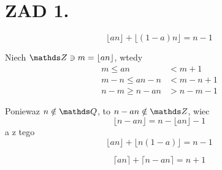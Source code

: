 \documentclass{article}[13pt]
\begin{document}
    \section*{ZAD 1.}
    $$\lfloor an\rfloor+\lfloor(1-a)n\rfloor=n-1$$

    Niech $\Z\ni m=\lfloor an\rfloor$, wtedy
    \begin{align*}
        m\leq an &<m+1\\
        m-n\leq an-n&<m-n+1\\
        n-m\geq n-an&> n-m-1
    \end{align*}

    Poniewaz $n\notin \Q$, to $n-an\notin \Z$, wiec
    $$\lfloor n-an\rfloor=n-\lfloor an\rfloor -1$$
    a z tego
    $$\lfloor an\rfloor+\lfloor n(1-a)\rfloor = n-1$$

    
    $$\lceil an\rceil + \lceil n-an\rceil=n+1$$
\end{document}
